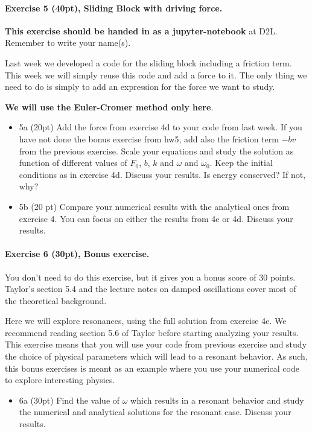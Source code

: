 \documentclass[%
oneside,                 %
final,                   %
10pt]{article}
\begin{document}
\paragraph{Exercise 5 (40pt), Sliding Block with driving force.}
\textbf{This exercise should be handed in as a jupyter-notebook} at D2L. Remember to write your name(s). 

Last week we developed a code for the sliding block including a friction term. This week we will simply reuse this code and add a force to it. The only thing we need to do is simply to add an expression for the force we want to study.

\textbf{We will use the Euler-Cromer method only here}.

\begin{itemize}
\item 5a (20pt) Add the force from exercise 4d to your code from last week. If you have not done the bonus exercise from hw5, add also the friction term $-bv$ from the previous exercise. Scale your equations and study the solution as function of different values of $F_0$, $b$, $k$ and $\omega$ and $\omega_0$. Keep the initial conditions as in exercise 4d. Discuss your results. Is energy conserved? If not, why? 

\item 5b (20 pt)  Compare your numerical results with the analytical ones from exercise 4. You can focus on either the results from 4e or 4d.  Discuss your results. 
\end{itemize}

\noindent
\paragraph{Exercise 6 (30pt), Bonus exercise.}
You don't need to do this exercise, but it gives you a bonus score of 30 points. Taylor's section 5.4 and the lecture notes on damped oscillations cover most of the theoretical background.

Here we will explore resonances, using the full solution from exercise 4e.  We recommend reading section 5.6 of Taylor before starting analyzing your results.   This exercise means that you will use your code from previous exercise and study the choice of physical parameters which will lead to a resonant behavior. As such, this bonus exercises is meant as an example where you use your numerical code to explore interesting physics. 

\begin{itemize}
\item 6a (30pt)  Find the value of $\omega$ which results in a resonant behavior and study the numerical and analytical solutions for the resonant case. Discuss your results. 
\end{itemize}

\noindent

\end{document}
